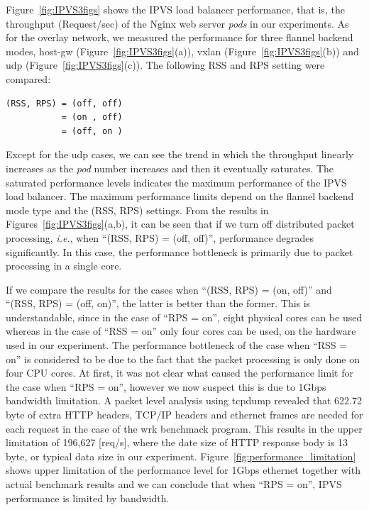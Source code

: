Figure~\ref{fig:IPVS3figs} shows the IPVS load balancer performance, that is, 
the throughput (Request/sec) of the Nginx web server {\em pods} in our experiments.
As for the overlay network, we measured the performance for three flannel backend modes, 
host-gw (Figure~\ref{fig:IPVS3figs}(a)), vxlan (Figure~\ref{fig:IPVS3figs}(b)) and udp (Figure~\ref{fig:IPVS3figs}(c)).
The following RSS and RPS setting were compared: 

\begin{center}
  \centering
  \begin{minipage}{0.8\columnwidth}
\begin{verbatim}
(RSS, RPS) = (off, off)
           = (on , off)
           = (off, on )
\end{verbatim}
  \end{minipage}
\end{center}

Except for the udp cases, we can see the trend in which the throughput linearly increases 
as the {\em pod} number increases and then it eventually saturates.
The saturated performance levels indicates the maximum performance of the IPVS load balancer.
The maximum performance limits depend on the flannel backend mode type and the (RSS, RPS) settings.
From the results in Figures~\ref{fig:IPVS3figs}(a,b), it can be seen that if we turn off distributed packet processing,
{\it i.e.}, when \enquote{(RSS, RPS) = (off, off)}, performance degrades significantly. 
In this case, the performance bottleneck is primarily due to packet processing in a single core.

If we compare the results for the cases when \enquote{(RSS, RPS) = (on, off)} and \enquote{(RSS, RPS) = (off, on)},
the latter is better than the former.
This is understandable, since in the case of \enquote{RPS = on}, eight physical cores can be used whereas 
in the case of \enquote{RSS = on} only four cores can be used, on the hardware used in our experiment.
The performance bottleneck of the case when \enquote{RSS = on} is considered 
to be due to the fact that the packet processing is only done on four CPU cores.
%
At first, it was not clear what caused the performance limit for the case when \enquote{RPS = on},
however we now suspect this is due to 1Gbps bandwidth limitation.
A packet level analysis using tcpdump\cite{jacobson1989tcpdump} revealed that 622.72 byte of extra HTTP headers, 
TCP/IP headers and ethernet frames are needed for each request in the case of the wrk benchmack program.  
This results in the upper limitation of 196,627 [req/s], where the date size of HTTP response body is 13 byte, or typical data size in our experiment. 
Figure~\ref{fig:performance_limitation} shows upper limitation of the performance level for 1Gbps ethernet together with 
actual benchmark results and we can conclude that when \enquote{RPS = on}, IPVS performance is limited by bandwidth.

